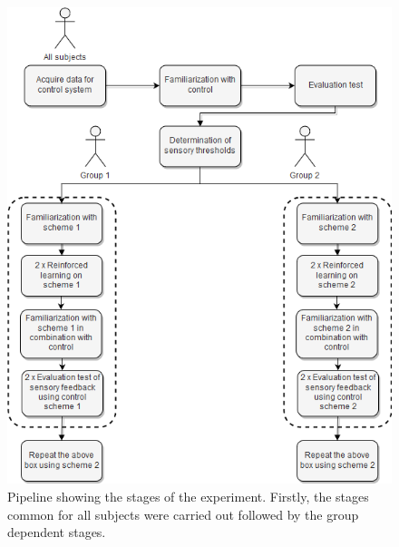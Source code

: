 \begin{figure}[H]                 
	\includegraphics[width=.65\textwidth]{figures/std_design}
	\caption{Pipeline showing the stages of the experiment. Firstly, the stages common for all subjects were carried out followed by the group dependent stages.}
	\label{fig:std} 
\end{figure}